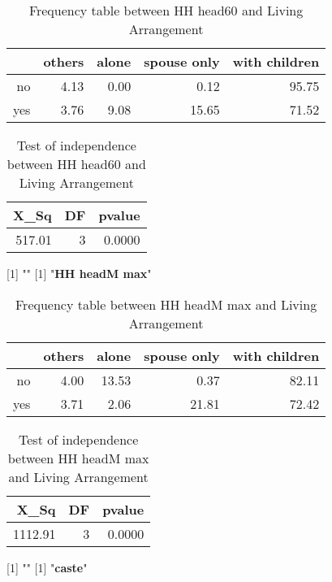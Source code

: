 \documentclass[11pt]{article}
\begin{document}
\begin{table}[H]
\centering
\begin{tabular}{rrrrr}
  \hline
 & others & alone & spouse only & with children \\ 
  \hline
no & 4.13 & 0.00 & 0.12 & 95.75 \\ 
  yes & 3.76 & 9.08 & 15.65 & 71.52 \\ 
   \hline
\end{tabular}
\caption{Frequency table between HH head60 and Living Arrangement} 
\end{table}
\begin{table}[H]
\centering
\begin{tabular}{rrr}
  \hline
X\_Sq & DF & pvalue \\ 
  \hline
517.01 & 3 & 0.0000 \\ 
   \hline
\end{tabular}
\caption{Test of independence between HH head60 and Living Arrangement} 
\end{table}
[1] "\newline"
[1] "{\bf{HH headM max}}"
\begin{table}[H]
\centering
\begin{tabular}{rrrrr}
  \hline
 & others & alone & spouse only & with children \\ 
  \hline
no & 4.00 & 13.53 & 0.37 & 82.11 \\ 
  yes & 3.71 & 2.06 & 21.81 & 72.42 \\ 
   \hline
\end{tabular}
\caption{Frequency table between HH headM max and Living Arrangement} 
\end{table}
\begin{table}[H]
\centering
\begin{tabular}{rrr}
  \hline
X\_Sq & DF & pvalue \\ 
  \hline
1112.91 & 3 & 0.0000 \\ 
   \hline
\end{tabular}
\caption{Test of independence between HH headM max and Living Arrangement} 
\end{table}
[1] "\newline"
[1] "{\bf{caste}}"
\end{document}

